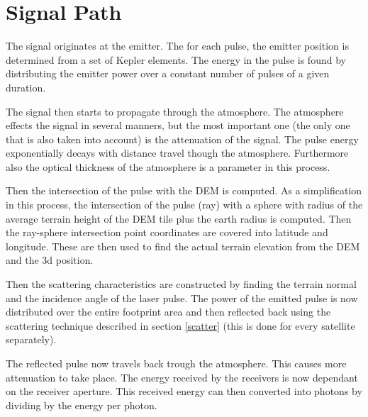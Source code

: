 \section{Signal Path}
\label{signPath}

The signal originates at the emitter. The for each pulse, the emitter position is determined from a
set of Kepler elements. The energy in the pulse is found by distributing the emitter power over a
constant number of pulses of a given duration.

The signal then starts to propagate through the atmosphere. The atmosphere effects the signal in
several manners, but the most important one (the only one that is also taken into account) is the
attenuation of the signal. The pulse energy exponentially decays with distance travel though the
atmosphere. Furthermore also the optical thickness of the atmosphere is a parameter in this process.

Then the intersection of the pulse with the \ac{DEM} is computed. As a simplification in this
process, the intersection of the pulse (ray) with a sphere with radius of the average terrain height
of the \ac{DEM} tile plus the earth radius is computed. Then the ray-sphere intersection point
coordinates are covered into latitude and longitude. These are then used to find the actual terrain
elevation from the \ac{DEM} and the 3d position.

Then the scattering characteristics are constructed by finding the terrain normal and the incidence
angle of the laser pulse. The power of the emitted pulse is now distributed over the entire
footprint area and then reflected back using the scattering technique described in section
\ref{scatter} (this is done for every satellite separately).

The reflected pulse now travels back trough the atmosphere. This causes more attenuation to take
place. The energy received by the receivers is now dependant on the receiver aperture. This received
energy can then converted into photons by dividing by the energy per photon.











